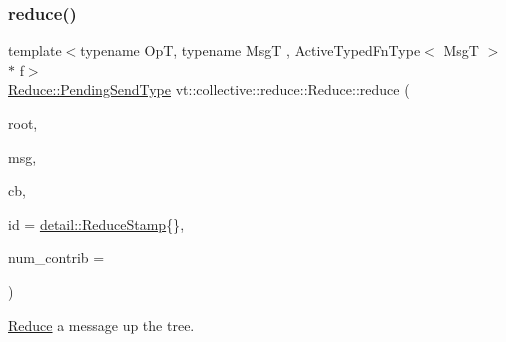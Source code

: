 \mbox{\label{structvt_1_1collective_1_1reduce_1_1_reduce_a3630a98801fa91fd9a0e5ffdf8731650}} 
\subsubsection{\texorpdfstring{reduce()}{reduce()}\hspace{0.1cm}{\footnotesize\ttfamily [5/10]}}
{\footnotesize\ttfamily template$<$typename OpT, typename MsgT , Active\+Typed\+Fn\+Type$<$ Msg\+T $>$ $\ast$ f$>$ \\
\hyperlink{structvt_1_1collective_1_1reduce_1_1_reduce_a0474b491f3c93014d9a0ce0356c6bfd5}{Reduce\+::\+Pending\+Send\+Type} vt\+::collective\+::reduce\+::\+Reduce\+::reduce (\begin{DoxyParamCaption}\item[{\hyperlink{namespacevt_a866da9d0efc19c0a1ce79e9e492f47e2}{Node\+Type} const \&}]{root,  }\item[{MsgT $\ast$}]{msg,  }\item[{\hyperlink{namespacevt_a57b238783d05de96bc2c4027f7073b7f}{Callback}$<$ MsgT $>$}]{cb,  }\item[{\hyperlink{namespacevt_1_1collective_1_1reduce_1_1detail_aacc1fcd729d934ba143fee3a943bf9e7}{detail\+::\+Reduce\+Stamp}}]{id = {\ttfamily \hyperlink{namespacevt_1_1collective_1_1reduce_1_1detail_aacc1fcd729d934ba143fee3a943bf9e7}{detail\+::\+Reduce\+Stamp}\{\}},  }\item[{\hyperlink{structvt_1_1collective_1_1reduce_1_1_reduce_a6c3e63aca10c31d2823b0b18cf9762a4}{Reduce\+Num\+Type} const \&}]{num\+\_\+contrib = {} }\end{DoxyParamCaption})}



\hyperlink{structvt_1_1collective_1_1reduce_1_1_reduce}{Reduce} a message up the tree. 


